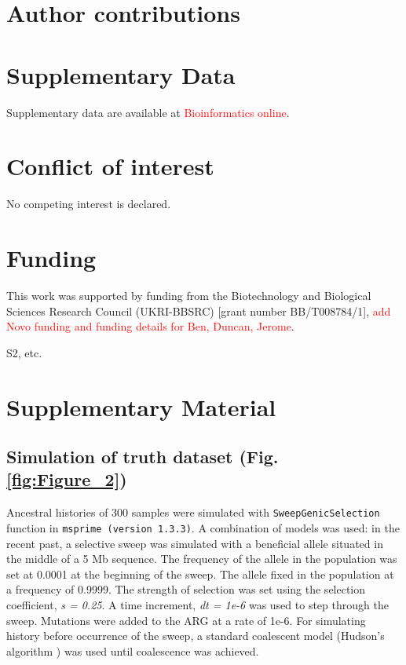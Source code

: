 \documentclass[unnumsec,webpdf,contemporary,large,namedate]{oup-authoring-template}%
\begin{document}
\section*{Author contributions}
\section*{Supplementary Data}
Supplementary data are available at \textcolor{red}{Bioinformatics online}.
\section*{Conflict of interest}
No competing interest is declared.
\section*{Funding}
This work was supported by funding from the Biotechnology and Biological
Sciences Research Council (UKRI-BBSRC) [grant number BB/T008784/1],
\textcolor{red}{add Novo funding and funding details for Ben, Duncan, Jerome}.



\clearpage \onecolumn \setcounter{figure}{0}  %
\renewcommand{\thefigure}{S\arabic{figure}}  %
S2, etc. \section{Supplementary Material} \subsection{Simulation of truth
dataset (Fig. \ref{fig:Figure_2})} \label{subsec:sweep_simulation} Ancestral
histories of 300 samples were simulated with \texttt{SweepGenicSelection}
function in \texttt{msprime (version 1.3.3)}. A combination of models was used:
in the recent past, a selective sweep was simulated with a beneficial allele
situated in the middle of a 5 Mb sequence. The frequency of the allele in the
population was set at 0.0001 at the beginning of the sweep. The allele fixed in
the population at a frequency of 0.9999. The strength of selection was set
using the selection coefficient, \textit{s = 0.25}. A time increment,
\textit{dt = 1e-6} was used to step through the sweep. Mutations were added to
the ARG at a rate of 1e-6. For simulating history before occurrence of the
sweep, a standard coalescent model (Hudson's algorithm \citep{Hudson1983}) was
used until coalescence was achieved. 
\end{document}
